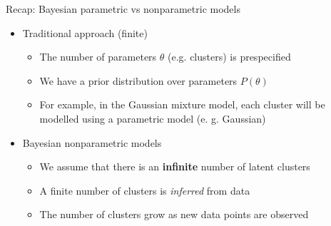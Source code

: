 \documentclass[handout]{beamer}
\begin{document}
\begin{frame}{Recap: Bayesian parametric vs nonparametric models}
    \begin{itemize}
        \item Traditional approach (finite)
           \begin{itemize}
               \item The number of parameters $\theta$ (e.g. clusters) is prespecified
               \item We have a prior distribution over parameters $P(\theta)$
               \item For example, in the Gaussian mixture model, each cluster will be modelled
                   using a parametric model (e. g. Gaussian)
           \end{itemize}
        \item Bayesian nonparametric models
           \begin{itemize}
               \item We assume that there is an \textbf{infinite} number of latent clusters
               \item A finite number of clusters is \textit{inferred} from data
               \item The number of clusters grow as new data points are observed
           \end{itemize}
    \end{itemize}
\end{frame}
\end{document}
